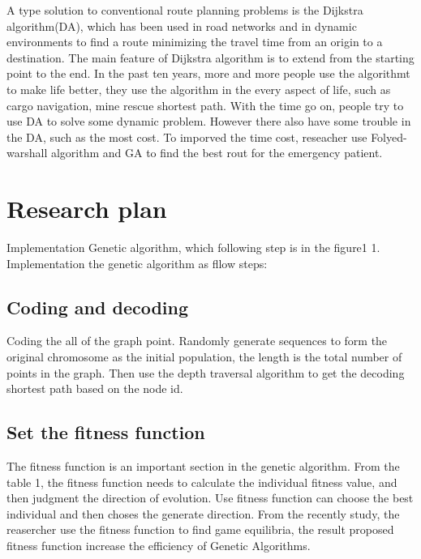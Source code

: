 \documentclass[12pt]{article}
\begin{document}
  





A type solution to conventional route planning problems is the Dijkstra algorithm(DA), which has been used in road networks and in dynamic environments to find a route minimizing the travel time from an origin to a destination. The main feature of Dijkstra algorithm is to extend from the starting point to the end. In the past ten years, more and more people use the algorithmt to make life better, they use the algorithm in the every aspect of life, such as cargo navigation, mine rescue shortest path. With the time go on, people try to use DA to solve some dynamic problem\cite{10.1007/978-3-319-60042-0_15}. However there also have some trouble in the DA, such as the most cost. To imporved the time cost, reseacher use Folyed-warshall algorithm and GA to find the best rout for the emergency patient\cite{Risald2017}. 



\section{Research plan}
Implementation Genetic algorithm, which following step is in the figure1
1. Implementation the genetic algorithm as fllow steps:
\subsection{Coding and decoding}
Coding the all of the graph point. Randomly generate sequences to form the original chromosome as the initial population, the length is the total number of points in the graph. Then use the depth traversal algorithm to get the decoding shortest path based on the node id.
\subsection{Set the fitness function}
The fitness function is an important section in the genetic algorithm. From the table 1, the fitness function needs to calculate the individual fitness value, and then judgment the direction of evolution. Use fitness function can choose the best individual and then choses the generate direction. From the recently study\cite{Gunturu2017}, the reasercher use the fitness function to find game equilibria, the result proposed  fitness function increase the efficiency of Genetic Algorithms. 
\end{document}
